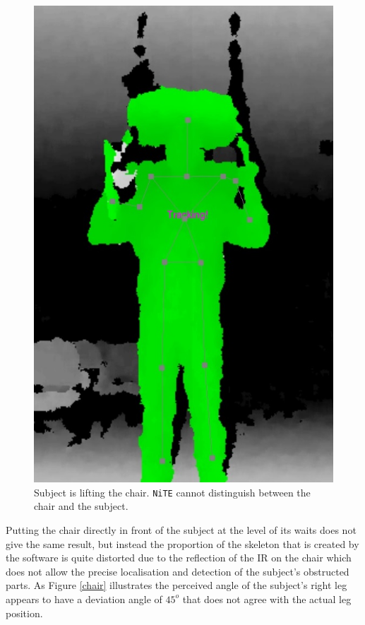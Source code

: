 \documentclass[10pt,a4paper]{article}
\begin{document}
\begin{figure}[H]
\center
\includegraphics[scale=0.2]{Head_Chair.jpg} 
\caption{Subject is lifting the chair. \texttt{NiTE} cannot distinguish between the chair and the subject.}
\label{lifting_chair}
\end{figure}

\noindent
Putting the chair directly in front of the subject at the level of its waits does not give the same result, but instead the proportion of the skeleton that is created by the software is quite distorted due to the reflection of the IR on the chair which does not allow the precise localisation and detection of the subject's obstructed parts. As Figure \ref{chair} illustrates the perceived angle of the subject's right leg appears to have a deviation angle of $45^o$ that does not agree with the actual leg position.
\end{document}
